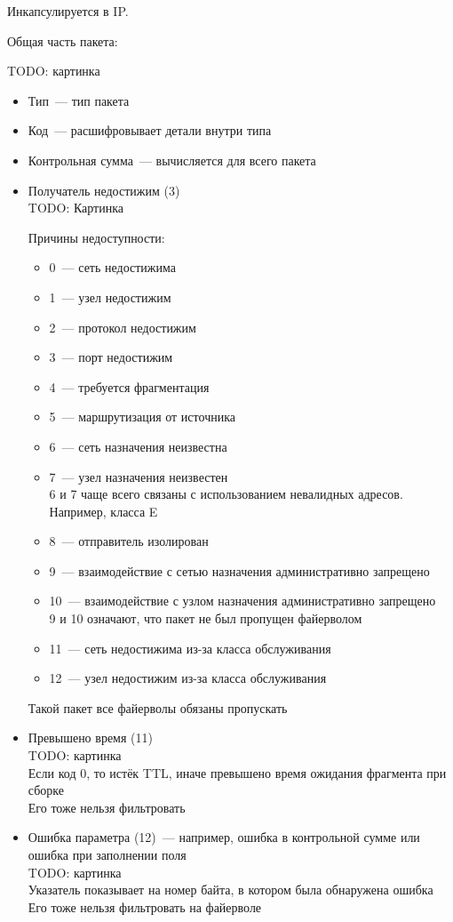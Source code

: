 Инкапсулируется в IP. 

Общая часть пакета:

TODO: картинка

\begin{itemize}
    \item Тип~--- тип пакета
    \item Код~--- расшифровывает детали внутри типа
    \item Контрольная сумма~--- вычисляется для всего пакета
\end{itemize}


\begin{itemize}
    \item Получатель недостижим (3)\\
    TODO: Картинка

    Причины недоступности:
    \begin{itemize}
        \item 0~--- сеть недостижима
        \item 1~--- узел недостижим
        \item 2~--- протокол недостижим
        \item 3~--- порт недостижим
        \item 4~--- требуется фрагментация
        \item 5~--- маршрутизация от источника
        \item 6~--- сеть назначения неизвестна
        \item 7~--- узел назначения неизвестен\\
        6 и 7 чаще всего связаны с использованием невалидных адресов. Например, класса E
        \item 8~--- отправитель изолирован
        \item 9~--- взаимодействие с сетью назначения административно запрещено
        \item 10~--- взаимодействие с узлом назначения административно запрещено\\
        9 и 10 означают, что пакет не был пропущен файерволом
        \item 11~--- сеть недостижима из-за класса обслуживания
        \item 12~--- узел недостижим из-за класса обслуживания
    \end{itemize}
    Такой пакет все файерволы обязаны пропускать
    \item Превышено время (11)\\
    TODO: картинка\\
    Если код 0, то истёк TTL, иначе превышено время ожидания фрагмента при сборке\\
    Его тоже нельзя фильтровать
    \item Ошибка параметра (12)~--- например, ошибка в контрольной сумме или ошибка при заполнении поля\\
    TODO: картинка\\
    Указатель показывает на номер байта, в котором была обнаружена ошибка\\
    Его тоже нельзя фильтровать на файерволе
\end{itemize}



